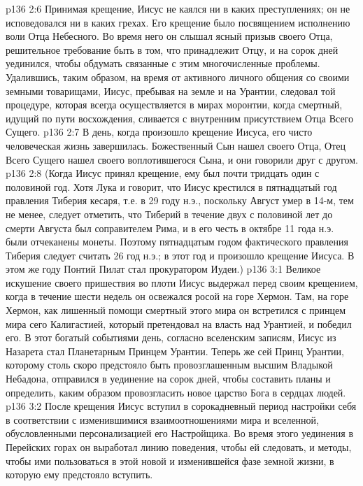 \vs p136 2:6 \pc Принимая крещение, Иисус не каялся ни в каких преступлениях; он не исповедовался ни в каких грехах. Его крещение было посвящением исполнению воли Отца Небесного. Во время него он слышал ясный призыв своего Отца, решительное требование быть в том, что принадлежит Отцу, и на сорок дней уединился, чтобы обдумать связанные с этим многочисленные проблемы. Удалившись, таким образом, на время от активного личного общения со своими земными товарищами, Иисус, пребывая на земле и на Урантии, следовал той процедуре, которая всегда осуществляется в мирах моронтии, когда смертный, идущий по пути восхождения, сливается с внутренним присутствием Отца Всего Сущего.
\vs p136 2:7 В день, когда произошло крещение Иисуса, его чисто человеческая жизнь завершилась. Божественный Сын нашел своего Отца, Отец Всего Сущего нашел своего воплотившегося Сына, и они говорили друг с другом.
\vs p136 2:8 \pc (Когда Иисус принял крещение, ему был почти тридцать один с половиной год. Хотя Лука и говорит, что Иисус крестился в пятнадцатый год правления Тиберия кесаря, т.е. в 29 году н.э., поскольку Август умер в 14\hyp{}м, тем не менее, следует отметить, что Тиберий в течение двух с половиной лет до смерти Августа был соправителем Рима, и в его честь в октябре 11 года н.э. были отчеканены монеты. Поэтому пятнадцатым годом фактического правления Тиберия следует считать 26 год н.э.; в этот год и произошло крещение Иисуса. В этом же году Понтий Пилат стал прокуратором Иудеи.)
\vs p136 3:1 Великое искушение своего пришествия во плоти Иисус выдержал перед своим крещением, когда в течение шести недель он освежался росой на горе Хермон. Там, на горе Хермон, как лишенный помощи смертный этого мира он встретился с принцем мира сего Калигастией, который претендовал на власть над Урантией, и победил его. В этот богатый событиями день, согласно вселенским записям, Иисус из Назарета стал Планетарным Принцем Урантии. Теперь же сей Принц Урантии, которому столь скоро предстояло быть провозглашенным высшим Владыкой Небадона, отправился в уединение на сорок дней, чтобы составить планы и определить, каким образом провозгласить новое царство Бога в сердцах людей.
\vs p136 3:2 После крещения Иисус вступил в сорокадневный период настройки себя в соответствии с изменившимися взаимоотношениями мира и вселенной, обусловленными персонализацией его Настройщика. Во время этого уединения в Перейских горах он выработал линию поведения, чтобы ей следовать, и методы, чтобы ими пользоваться в этой новой и изменившейся фазе земной жизни, в которую ему предстояло вступить.
